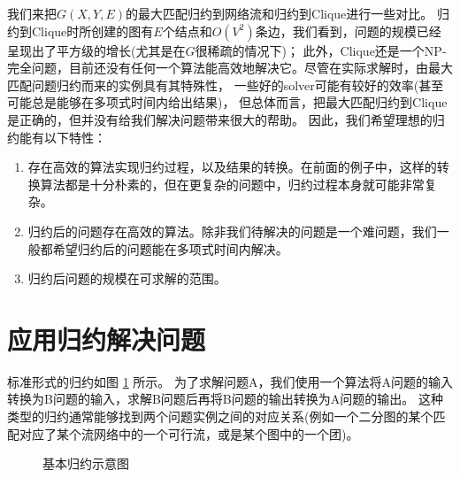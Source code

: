 我们来把$G(X,Y,E)$的最大匹配归约到网络流和归约到Clique进行一些对比。
归约到Clique时所创建的图有$E$个结点和$O(V^2)$条边，我们看到，问题的规模已经呈现出了平方级的增长(尤其是在$G$很稀疏的情况下)；
此外，Clique还是一个NP-完全问题，目前还没有任何一个算法能高效地解决它。尽管在实际求解时，由最大匹配问题归约而来的实例具有其特殊性，
一些好的solver可能有较好的效率(甚至可能总是能够在多项式时间内给出结果)，
但总体而言，把最大匹配归约到Clique是正确的，但并没有给我们解决问题带来很大的帮助。
因此，我们希望理想的归约能有以下特性：

\begin{enumerate}
 \item 存在高效的算法实现归约过程，以及结果的转换。在前面的例子中，这样的转换算法都是十分朴素的，但在更复杂的问题中，归约过程本身就可能非常复杂。
 \item 归约后的问题存在高效的算法。除非我们待解决的问题是一个难问题，我们一般都希望归约后的问题能在多项式时间内解决。
 \item 归约后问题的规模在可求解的范围。
\end{enumerate}

\section{应用归约解决问题}

标准形式的归约如图 \ref{fig:reduction-show} 所示。
为了求解问题A，我们使用一个算法将A问题的输入转换为B问题的输入，求解B问题后再将B问题的输出转换为A问题的输出。
这种类型的归约通常能够找到两个问题实例之间的对应关系(例如一个二分图的某个匹配对应了某个流网络中的一个可行流，或是某个图中的一个团)。

\begin{figure}[h]
 \center
 \caption{基本归约示意图}
 \label{fig:reduction-show}
\end{figure}

